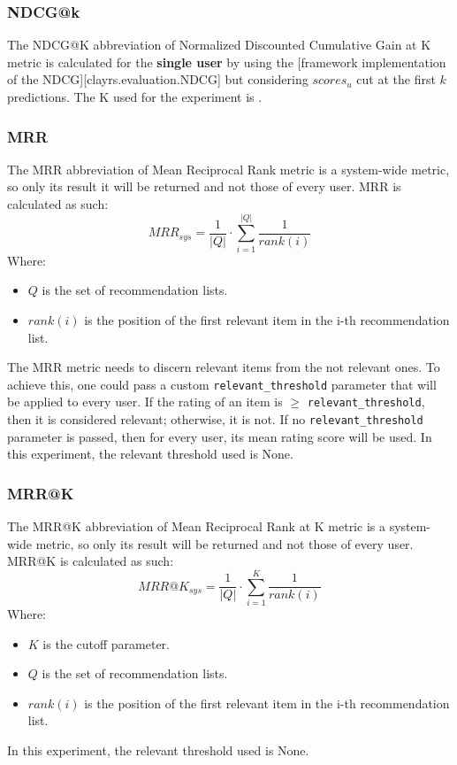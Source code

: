 \documentclass[11pt]{article}
\begin{document}
\subsubsection{NDCG@k}\label{subsubsec:ndcg-k}
The NDCG@K abbreviation of Normalized Discounted Cumulative Gain at K metric is calculated for the \textbf{single user}
by using the [framework implementation of the NDCG][clayrs.evaluation.NDCG] but considering $scores_{u}$ cut at the
first $k$ predictions.
The K used for the experiment is .
\hfill\break
\hfill\break

\subsubsection{MRR}\label{subsubsec:mrr}
The MRR abbreviation of Mean Reciprocal Rank metric is a system-wide metric, so only its result it will be returned
and not those of every user.
MRR is calculated as such:
\hfill\break
\hfill\break
    \[
        MRR_{sys} = \frac{1}{|Q|}\cdot\sum_{i=1}^{|Q|}\frac{1}{rank(i)}
    \]
\hfill\break
\hfill\break
    Where:
\begin{itemize}
    \item $Q$ is the set of recommendation lists.
    \item $rank(i)$ is the position of the first relevant item in the i-th recommendation list.
\end{itemize}
\hfill\break
\hfill\break
The MRR metric needs to discern relevant items from the not relevant ones.
To achieve this, one could pass a custom \texttt{relevant\_threshold} parameter that will be applied to every user.
If the rating of an item is $\geq$ \texttt{relevant\_threshold}, then it is considered relevant; otherwise, it is not.
If no \texttt{relevant\_threshold} parameter is passed, then for every user, its mean rating score will be used.
In this experiment, the relevant threshold used is
None.
\hfill\break
\hfill\break

\subsubsection{MRR@K}\label{subsubsec:mrr-k}
The MRR@K abbreviation of Mean Reciprocal Rank at K metric is a system-wide metric, so only its result will be returned
and not those of every user.
MRR@K is calculated as such:
\hfill\break
\hfill\break
    \[
        MRR@K_{sys} = \frac{1}{|Q|}\cdot\sum_{i=1}^{K}\frac{1}{rank(i)}
    \]
\hfill\break
\hfill\break
    Where:
\begin{itemize}
    \item $K$ is the cutoff parameter.
    \item $Q$ is the set of recommendation lists.
    \item $rank(i)$ is the position of the first relevant item in the i-th recommendation list.
\end{itemize}
\hfill\break
\hfill\break
In this experiment, the relevant threshold used is
None.
\hfill\break
\hfill\break
\end{document}

